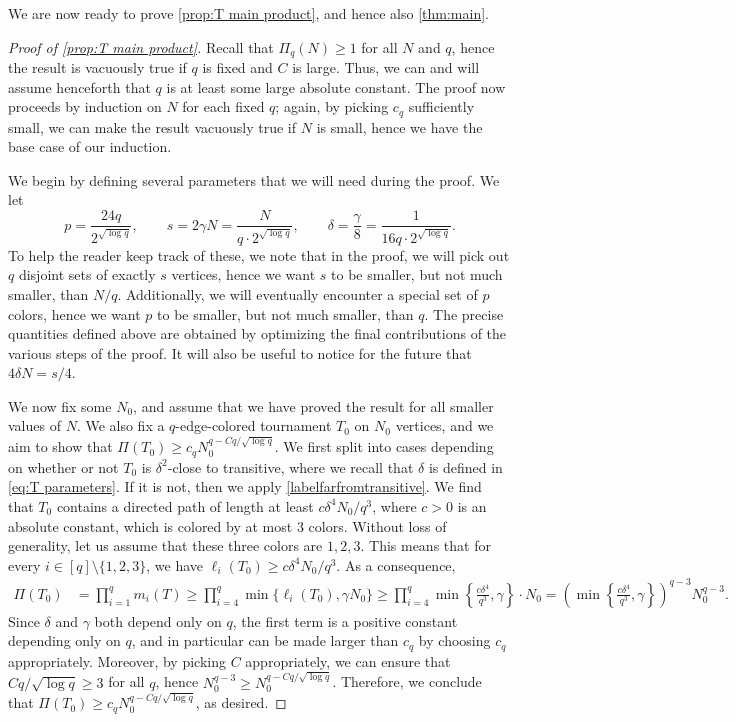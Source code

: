 \documentclass[11pt,reqno]{amsart}
\theoremstyle{definition}
\newcommand\1{\mathbf{1}}
\let\geq\geqslant
\begin{document}
We are now ready to prove \cref{prop:T main product}, and hence also \cref{thm:main}.
\begin{proof}[Proof of \cref{prop:T main product}]
    Recall that $\Pi_q(N) \geq 1$ for all $N$ and $q$, hence the result is vacuously true if $q$ is fixed and $C$ is large. Thus, we can and will assume henceforth that $q$ is at least some large absolute constant. The proof now proceeds by induction on $N$ for each fixed $q$; again, by picking $c_q$ sufficiently small, we can make the result vacuously true if $N$ is small, hence we have the base case of our induction. 

    We begin by defining several parameters that we will need during the proof. We let 
    \begin{equation}\label{eq:T parameters}
        p = \frac{24q}{2^{\sqrt{\log q}}}, \qquad s =2\gamma N= \frac{N}{q\cdot 2^{\sqrt{\log q}}}, \qquad \delta=\frac \gamma 8 = \frac{1}{16 q\cdot 2^{\sqrt{\log q}}}.
    \end{equation}
    To help the reader keep track of these, we note that in the proof, we will pick out $q$ disjoint sets of exactly $s$ vertices, hence we want $s$ to be smaller, but not much smaller, than $N/q$. Additionally, we will eventually encounter a special set of $p$ colors, hence we want $p$ to be smaller, but not much smaller, than $q$. The precise quantities defined above are obtained by optimizing the final contributions of the various steps of the proof. It will also be useful to notice for the future that $4\delta N = s/4$.

    We now fix some $N_0$, and assume that we have proved the result for all smaller values of $N$. We also fix a $q$-edge-colored tournament $T_0$ on $N_0$ vertices, and we aim to show that $\Pi(T_0) \geq c_q N_0^{q-Cq/\sqrt{\log q}}$. We first split into cases depending on whether or not $T_0$ is $\delta^2$-close to transitive, where we recall that $\delta$ is defined in \eqref{eq:T parameters}. If it is not, then we apply \cref{labelfarfromtransitive}. We find that $T_0$ contains a directed path of length at least $c\delta^4 N_0/q^3$, where $c>0$ is an absolute constant, which is colored by at most $3$ colors. Without loss of generality, let us assume that these three colors are $1,2,3$. This means that for every $i \in [q]\setminus\{1,2,3\}$, we have $\ell_i(T_0) \geq c\delta^4 N_0/q^3$.  As a consequence,
    \begin{align*}
        \Pi(T_0) &=\prod_{i=1}^q m_i(T) \geq \prod_{i=4}^q \min\{\ell_i(T_0),\gamma N_0\} \geq \prod_{i=4}^q \min \left\{ \frac{c\delta^4}{q^3},\gamma \right\}\cdot N_0=\left( \min \left\{ \frac{c\delta^4}{q^3},\gamma \right\} \right)^{q-3} N_0^{q-3}.
    \end{align*}
    Since $\delta$ and $\gamma$ both depend only on $q$, the first term is a positive constant depending only on $q$, and in particular can be made larger than $c_q$ by choosing $c_q$ appropriately. Moreover, by picking $C$ appropriately, we can ensure that $Cq/\sqrt{\log q}\geq 3$ for all $q$, hence $N_0^{q-3}\geq N_0^{q-Cq/\sqrt{\log q}}$. Therefore, we conclude that $\Pi(T_0) \geq c_q N_0^{q-Cq/\sqrt{\log q}}$, as desired. 


\end{proof}
\end{document}
